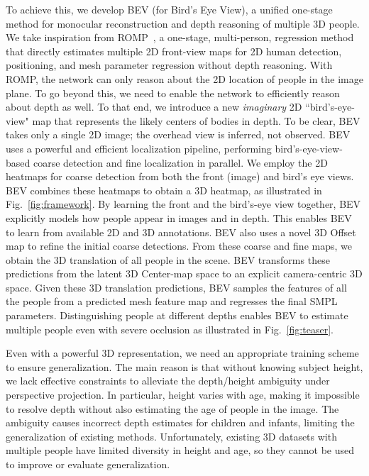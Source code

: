 \documentclass[10pt,twocolumn,letterpaper]{article}
\begin{document}
To achieve this, we develop BEV (for Bird's Eye View), a unified one-stage method for monocular reconstruction and depth reasoning of multiple 3D people.
We take inspiration from ROMP~\cite{romp}, a one-stage, multi-person, regression method that directly estimates multiple 2D front-view maps for 2D human detection, positioning, and mesh parameter regression without depth reasoning.
With ROMP, the network can only reason about the 2D location of people in the image plane.
To go beyond this, we need to enable the network to efficiently reason about depth as well.
To that end, we introduce a new {\em imaginary} 2D ``bird's-eye-view" map that represents the likely centers of bodies in depth. 
To be clear, BEV takes only a single 2D image; the overhead view is inferred, not observed.
BEV uses a powerful and efficient localization pipeline, performing bird's-eye-view-based coarse detection and fine localization in parallel.
We employ the 2D heatmaps for coarse detection from both the front (image) and bird's eye views.
BEV combines these heatmaps to obtain a 3D heatmap, as illustrated in Fig.~\ref{fig:framework}.
By learning the front and the bird's-eye view together, BEV explicitly models how people appear in images and in depth.
This enables BEV to learn from available 2D and 3D annotations. BEV also uses a novel 3D Offset map to refine the initial coarse detections.
From these coarse and fine maps, we obtain the 3D translation of all people in the scene.
BEV transforms these predictions from the latent 3D Center-map space to an explicit camera-centric 3D space.
Given these 3D translation predictions, BEV samples the features of all the people from a predicted mesh feature map and regresses the final SMPL \cite{smpl} parameters.
Distinguishing people at different depths enables BEV to estimate multiple people even with severe occlusion as illustrated in Fig.~\ref{fig:teaser}.


Even with a powerful 3D representation, we need an appropriate training scheme to ensure generalization. The main reason is that without knowing subject height, we lack effective constraints to alleviate the depth/height ambiguity under perspective projection. In particular, height varies with age, making it impossible to resolve depth without also estimating the age of people in the image. The ambiguity causes incorrect depth estimates for children and infants, limiting the generalization of existing methods. 
Unfortunately, existing 3D datasets with multiple people have limited diversity in height and age, so they cannot be used to improve or evaluate generalization. 
\end{document}
